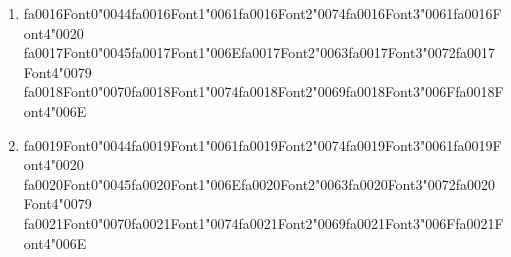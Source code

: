\documentclass[12pt]{article}
\begin{document}
\begin{enumerate}[label=\arabic*.]
\begin{enumerate}[label=(\alph*)]
    \item {\csname fa0016Font0\endcsname\char"0044}{\csname fa0016Font1\endcsname\char"0061}{\csname fa0016Font2\endcsname\char"0074}{\csname fa0016Font3\endcsname\char"0061}{\csname fa0016Font4\endcsname\char"0020} {\csname fa0017Font0\endcsname\char"0045}{\csname fa0017Font1\endcsname\char"006E}{\csname fa0017Font2\endcsname\char"0063}{\csname fa0017Font3\endcsname\char"0072}{\csname fa0017Font4\endcsname\char"0079} {\csname fa0018Font0\endcsname\char"0070}{\csname fa0018Font1\endcsname\char"0074}{\csname fa0018Font2\endcsname\char"0069}{\csname fa0018Font3\endcsname\char"006F}{\csname fa0018Font4\endcsname\char"006E}
    \item {\csname fa0019Font0\endcsname\char"0044}{\csname fa0019Font1\endcsname\char"0061}{\csname fa0019Font2\endcsname\char"0074}{\csname fa0019Font3\endcsname\char"0061}{\csname fa0019Font4\endcsname\char"0020} {\csname fa0020Font0\endcsname\char"0045}{\csname fa0020Font1\endcsname\char"006E}{\csname fa0020Font2\endcsname\char"0063}{\csname fa0020Font3\endcsname\char"0072}{\csname fa0020Font4\endcsname\char"0079} {\csname fa0021Font0\endcsname\char"0070}{\csname fa0021Font1\endcsname\char"0074}{\csname fa0021Font2\endcsname\char"0069}{\csname fa0021Font3\endcsname\char"006F}{\csname fa0021Font4\endcsname\char"006E}
\end{enumerate}
\end{enumerate}
\end{document}
